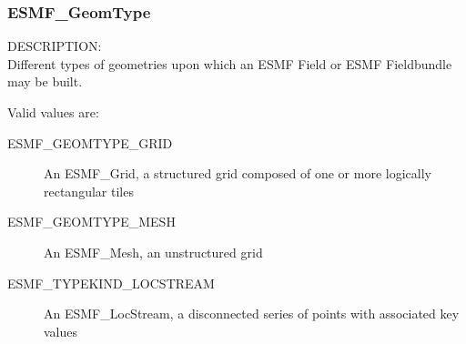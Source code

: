 \subsubsection{ESMF\_GeomType}
\label{opt:geomtype}

{\sf DESCRIPTION:\\}
Different types of geometries upon which an ESMF Field or ESMF Fieldbundle may
be built. 

Valid values are:
\begin{description}
\item [ESMF\_GEOMTYPE\_GRID]
      An ESMF\_Grid, a structured grid composed of one or more logically rectangular tiles
\item [ESMF\_GEOMTYPE\_MESH]
      An ESMF\_Mesh, an unstructured grid
\item [ESMF\_TYPEKIND\_LOCSTREAM]
      An ESMF\_LocStream, a disconnected series of points with associated key values
\end{description}



